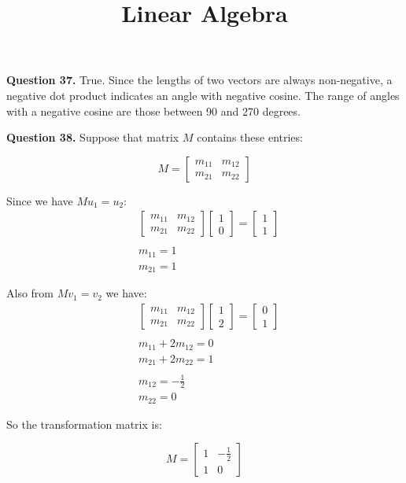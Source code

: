 \documentclass{ximera}
\title{Linear Algebra}
\begin{document}
\maketitle

\textbf{Question 37.} True. Since the lengths of two vectors are always non-negative, a negative dot product indicates an angle with negative cosine. The range of angles with a negative cosine are those between 90 and 270 degrees.

\textbf{Question 38.} 
Suppose that matrix $M$ contains these entries:
\begin{center}
\begin{equation*}
M =
\begin{bmatrix}
m_{11} & m_{12} \\
m_{21} & m_{22}
\end{bmatrix}
\end{equation*}
\end{center}

Since we have $M u_1 = u_2$:
\begin{align*}
&\begin{bmatrix}
m_{11} & m_{12} \\
m_{21} & m_{22}
\end{bmatrix}
\begin{bmatrix}
1 \\
0
\end{bmatrix}
= 
\begin{bmatrix}
1 \\
1
\end{bmatrix} \\
\\
& m_{11} = 1 \\
& m_{21} = 1
\end{align*}

Also from  $M v_1 = v_2$ we have:
\begin{align*}
&\begin{bmatrix}
m_{11} & m_{12} \\
m_{21} & m_{22}
\end{bmatrix}
\begin{bmatrix}
1 \\
2
\end{bmatrix}
= 
\begin{bmatrix}
0 \\
1
\end{bmatrix} \\
\\
& m_{11} + 2 m_{12} = 0 \\
& m_{21} + 2 m_{22} = 1 \\
\\
&m_{12} = - \frac{1}{2} \\
&m_{22} = 0
\end{align*}

So the transformation matrix is:
\begin{center}
\begin{equation*}
M =
\begin{bmatrix}
1 & -\frac{1}{2} \\
1 & 0
\end{bmatrix}
\end{equation*}
\end{center}
\end{document}
